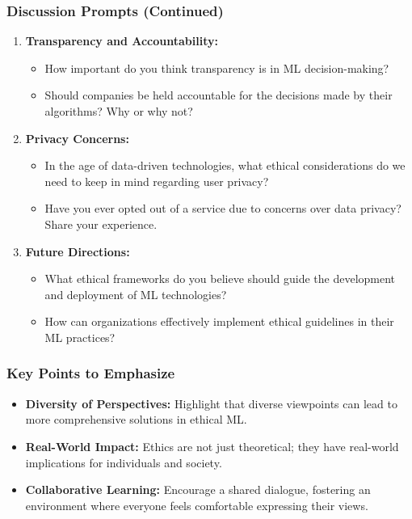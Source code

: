 \documentclass[aspectratio=169]{beamer}
\begin{document}
\begin{frame}[fragile]
    \frametitle{Discussion Prompts (Continued)}
    \begin{enumerate}[resume]
        \item \textbf{Transparency and Accountability:}
            \begin{itemize}
                \item How important do you think transparency is in ML decision-making?
                \item Should companies be held accountable for the decisions made by their algorithms? Why or why not?
            \end{itemize}
        \item \textbf{Privacy Concerns:}
            \begin{itemize}
                \item In the age of data-driven technologies, what ethical considerations do we need to keep in mind regarding user privacy?
                \item Have you ever opted out of a service due to concerns over data privacy? Share your experience.
            \end{itemize}
        \item \textbf{Future Directions:}
            \begin{itemize}
                \item What ethical frameworks do you believe should guide the development and deployment of ML technologies?
                \item How can organizations effectively implement ethical guidelines in their ML practices?
            \end{itemize}
    \end{enumerate}
\end{frame}

\begin{frame}[fragile]
    \frametitle{Key Points to Emphasize}
    \begin{itemize}
        \item \textbf{Diversity of Perspectives:} Highlight that diverse viewpoints can lead to more comprehensive solutions in ethical ML.
        \item \textbf{Real-World Impact:} Ethics are not just theoretical; they have real-world implications for individuals and society.
        \item \textbf{Collaborative Learning:} Encourage a shared dialogue, fostering an environment where everyone feels comfortable expressing their views.
    \end{itemize}
\end{frame}
\end{document}
